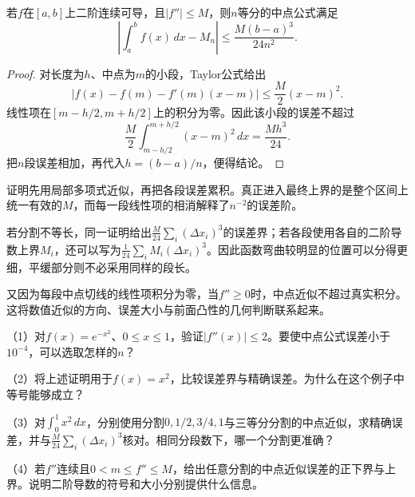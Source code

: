 \begin{proposition}\label{prop:calculus-midpoint-error}
若\(f\)在\([a,b]\)上二阶连续可导，且\(|f''|\le M\)，则\(n\)等分的中点公式满足
\begin{equation*}
 \left|\int_a^b f(x)\,dx-M_n\right|\le\frac{M(b-a)^3}{24n^2}.
\end{equation*}
\end{proposition}

\begin{proof}
对长度为\(h\)、中点为\(m\)的小段，Taylor公式给出
\begin{equation*}
 |f(x)-f(m)-f'(m)(x-m)|\le\frac M2(x-m)^2.
\end{equation*}
线性项在\([m-h/2,m+h/2]\)上的积分为零。因此该小段的误差不超过
\begin{equation*}
 \frac M2\int_{m-h/2}^{m+h/2}(x-m)^2\,dx=\frac{Mh^3}{24}.
\end{equation*}
把\(n\)段误差相加，再代入\(h=(b-a)/n\)，便得结论。
\end{proof}

证明先用局部多项式近似，再把各段误差累积。真正进入最终上界的是整个区间上统一有效的\(M\)，而每一段线性项的相消解释了\(n^{-2}\)的误差阶。

若分割不等长，同一证明给出\(\frac M{24}\sum_i(\Delta x_i)^3\)的误差界；若各段使用各自的二阶导数上界\(M_i\)，还可以写为\(\frac1{24}\sum_iM_i(\Delta x_i)^3\)。因此函数弯曲较明显的位置可以分得更细，平缓部分则不必采用同样的段长。

又因为每段中点切线的线性项积分为零，当\(f''\ge0\)时，中点近似不超过真实积分。这将数值近似的方向、误差大小与前面凸性的几何判断联系起来。

\begin{exercise}
\mbox{}\par\nobreak

（1）对\(f(x)=e^{-x^2}\)、\(0\le x\le1\)，验证\(|f''(x)|\le2\)。要使中点公式误差小于\(10^{-4}\)，可以选取怎样的\(n\)？

（2）将上述证明用于\(f(x)=x^2\)，比较误差界与精确误差。为什么在这个例子中等号能够成立？

\begin{samepage}
（3）对\(\int_0^1x^2\,dx\)，分别使用分割\(0,1/2,3/4,1\)与三等分分割的中点近似，求精确误差，并与\(\frac M{24}\sum_i(\Delta x_i)^3\)核对。相同分段数下，哪一个分割更准确？
\par
\end{samepage}

（4）若\(f''\)连续且\(0<m\le f''\le M\)，给出任意分割的中点近似误差的正下界与上界。说明二阶导数的符号和大小分别提供什么信息。
\end{exercise}

